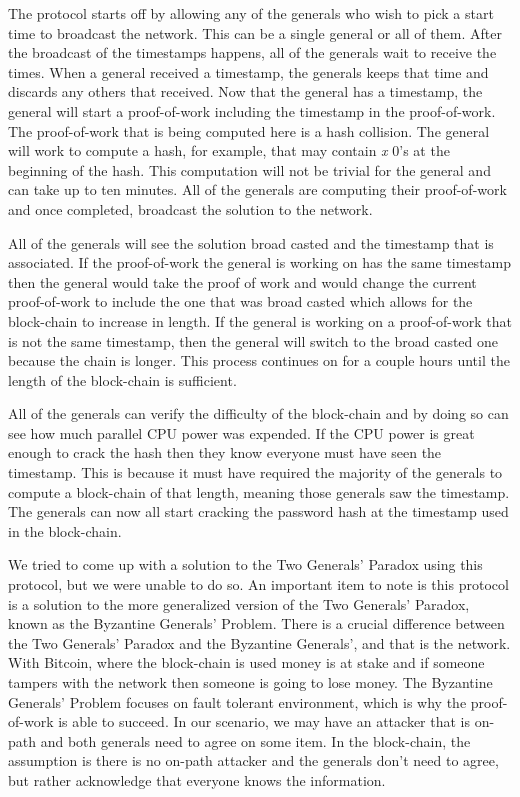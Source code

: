 \documentclass[10pt,letterpaper]{article}
\begin{document}
\begin{multicols}{2}
The protocol starts off by allowing any of the generals who wish to pick a start time to broadcast the network. This can be a single general or all of them. After the broadcast of the timestamps
happens, all of the generals wait to receive the times. When a general received a timestamp, the generals keeps that time and discards any others that received. Now that the general has a timestamp,
the general will start a proof-of-work including the timestamp in the proof-of-work. The proof-of-work that is being computed here is a hash collision. The general will work to compute a hash,
for example, that may contain \textit{x} 0's at the beginning of the hash. This computation will not be trivial for the general and can take up to ten minutes. All of the generals are computing
their proof-of-work and once completed, broadcast the solution to the network.

All of the generals will see the solution broad casted and the timestamp that is associated. If the proof-of-work the general is working on has the same timestamp then the general would take the
proof of work and would change the current proof-of-work to include the one that was broad casted which allows for the block-chain to increase in length. If the general is working on a proof-of-work
that is not the same timestamp, then the general will switch to the broad casted one because the chain is longer. This process continues on for a couple hours until the length of the block-chain is sufficient.

All of the generals can verify the difficulty of the block-chain and by doing so can see how much parallel CPU power was expended. If the CPU power is great enough to crack the hash then they know
everyone must have seen the timestamp. This is because it must have required the majority of the generals to compute a block-chain of that length, meaning those generals saw the timestamp. The generals
can now all start cracking the password hash at the timestamp used in the block-chain.

We tried to come up with a solution to the Two Generals' Paradox using this protocol, but we were unable to do so. An important item to note is this protocol is a solution to the more generalized
version of the Two Generals' Paradox, known as the Byzantine Generals' Problem. There is a crucial difference between the Two Generals' Paradox and the Byzantine Generals', and that is the network.
With Bitcoin, where the block-chain is used money is at stake and if someone tampers with the network then someone is going to lose money. The Byzantine Generals' Problem focuses on fault tolerant
environment, which is why the proof-of-work is able to succeed. In our scenario, we may have an attacker that is on-path and both generals need to agree on some item. In the block-chain, the assumption
is there is no on-path attacker and the generals don't need to agree, but rather acknowledge that everyone knows the information.


\end{multicols}
\end{document}
